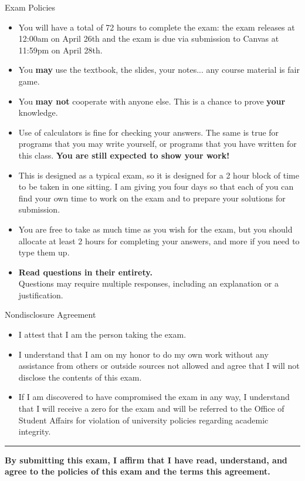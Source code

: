 \documentclass[12pt,addpoints,answers]{exam}
\begin{document}
\vspace*{0.25in}
\begin{center}\Large{Exam Policies}\end{center}
\begin{itemize}
\item You will have a total of 72 hours to complete the exam: the exam releases at 12:00am on April 26th and the exam is due via submission to Canvas at 11:59pm on April 28th.
\item You \textbf{may} use the textbook, the slides, your notes... any course material is fair game.
\item You \textbf{may not} cooperate with anyone else. This is a chance to prove \textbf{your} knowledge.
\item Use of calculators is fine for checking your answers. The same is true for programs that you may write yourself, or programs that you have written for this class. \textbf{You are still expected to show your work!}
\item This is designed as a typical exam, so it is designed for a 2 hour block of time to be taken in one sitting. I am giving you four days so that each of you can find your own time to work on the exam and to prepare your solutions for submission.
\item You are free to take as much time as you wish for the exam, but you should allocate at least 2 hours for completing your answers, and more if you need to type them up.
\item \textbf{Read questions in their entirety.}\\Questions may require multiple responses, including an explanation or a justification.
\end{itemize}
\vfill
\begin{center}\Large{Nondisclosure Agreement}\end{center}
\begin{itemize}
\item I attest that I am the person taking the exam.
\item I understand that I am on my honor to do my own work without any assistance from others or outside sources not allowed and agree that I will not disclose the contents of this exam.
\item If I am discovered to have compromised the exam in any way, I understand that I will receive a zero for the exam and will be referred to the Office of Student Affairs for violation of university policies regarding academic integrity.
\end{itemize}
\vspace*{0.25in}
\hrule
\vspace*{0.25in}
\textbf{By submitting this exam, I affirm that I have read, understand, and agree to the policies of this exam and the terms this agreement.}
\vspace*{0.25in}
\newpage
\end{document}
